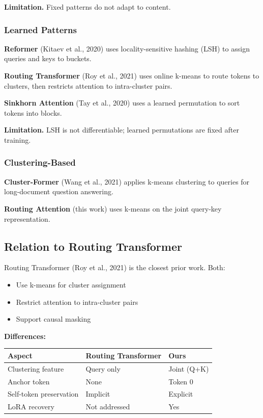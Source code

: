 \textbf{Limitation.} Fixed patterns do not adapt to content.

\subsubsection{Learned Patterns}

\textbf{Reformer} (Kitaev et al., 2020) uses locality-sensitive hashing (LSH) to 
assign queries and keys to buckets.

\textbf{Routing Transformer} (Roy et al., 2021) uses online k-means to route 
tokens to clusters, then restricts attention to intra-cluster pairs.

\textbf{Sinkhorn Attention} (Tay et al., 2020) uses a learned permutation to sort 
tokens into blocks.

\textbf{Limitation.} LSH is not differentiable; learned permutations are fixed 
after training.

\subsubsection{Clustering-Based}

\textbf{Cluster-Former} (Wang et al., 2021) applies k-means clustering to queries 
for long-document question answering.

\textbf{Routing Attention} (this work) uses k-means on the joint query-key 
representation.

\subsection{Relation to Routing Transformer}

Routing Transformer (Roy et al., 2021) is the closest prior work. Both:

\begin{itemize}
\item Use k-means for cluster assignment
\item Restrict attention to intra-cluster pairs
\item Support causal masking

\end{itemize}
\textbf{Differences:}

\begin{table}[H]
\centering
\small
\begin{tabular}{lll}
\toprule
\textbf{Aspect} & \textbf{Routing Transformer} & \textbf{Ours} \\
\midrule
Clustering feature & Query only & Joint (Q+K) \\
Anchor token & None & Token 0 \\
Self-token preservation & Implicit & Explicit \\
LoRA recovery & Not addressed & Yes \\
\bottomrule
\end{tabular}
\end{table}

